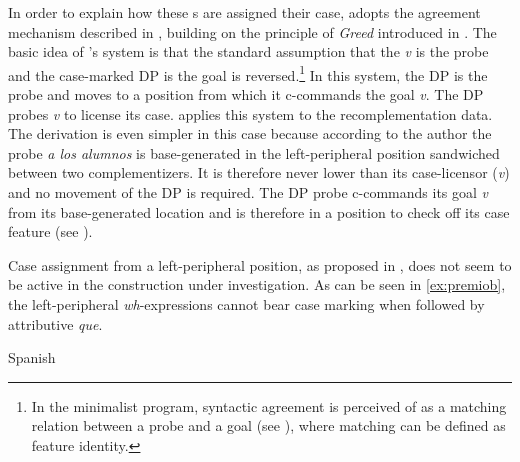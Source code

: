 In order to explain how these s are assigned their  case, \citet{VillaGarcia2015} adopts the agreement mechanism described in  \citet{Boskovic2007}, building on the principle of \emph{Greed} introduced in \citet{Chomsky1993}. The basic idea of  \citeauthor{Boskovic2007}'s system is that the standard assumption that the \emph{v} is the probe and the case-marked DP is the goal is reversed.\footnote{In the minimalist program, syntactic agreement is perceived of as a matching relation between a probe and a goal (see \citealt{Chomsky2000}), where matching can be defined as  feature identity.} In this system, the DP is the probe and moves to a position from which it c-commands the goal \emph{v}. The DP probes  \emph{v} to license its case. \citet{VillaGarcia2015} applies this system to the recomplementation data. The derivation is even simpler in this case because according to the author the probe \emph{a los alumnos} is base-generated in the left-peripheral position sandwiched between two complementizers. It is therefore never lower than its case-licensor (\emph{v}) and no movement of the DP is required. The DP probe c-commands its goal \emph{v} from its base-generated location and is therefore in a position to check off its case feature (see \citealt[168--170]{VillaGarcia2015}).

Case assignment from a left-peripheral position, as proposed in \citet{VillaGarcia2015}, does not seem to be active in the construction under investigation. As  can be seen in \eqref{ex:premiob}, the left-peripheral \textit{wh}-expressions cannot bear case marking when followed by attributive \emph{que}. 

\ea Spanish\\ 
\z
\z


